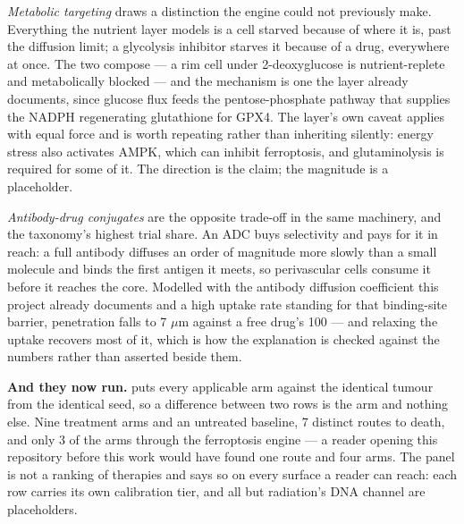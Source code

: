 \documentclass[11pt,twoside,openright]{report}
\begin{document}
\textit{Metabolic targeting} draws a distinction the engine could not previously make. Everything the nutrient layer models is a cell starved because of where it is, past the diffusion limit; a glycolysis inhibitor starves it because of a drug, everywhere at once. The two compose --- a rim cell under 2-deoxyglucose is nutrient-replete and metabolically blocked --- and the mechanism is one the layer already documents, since glucose flux feeds the pentose-phosphate pathway that supplies the NADPH regenerating glutathione for GPX4. The layer's own caveat applies with equal force and is worth repeating rather than inheriting silently: energy stress also activates AMPK, which can inhibit ferroptosis, and glutaminolysis is required for some of it. The direction is the claim; the magnitude is a placeholder.

\textit{Antibody-drug conjugates} are the opposite trade-off in the same machinery, and the taxonomy's highest trial share. An ADC buys selectivity and pays for it in reach: a full antibody diffuses an order of magnitude more slowly than a small molecule and binds the first antigen it meets, so perivascular cells consume it before it reaches the core. Modelled with the antibody diffusion coefficient this project already documents and a high uptake rate standing for that binding-site barrier, penetration falls to 7 $\mu$m against a free drug's 100 --- and relaxing the uptake recovers most of it, which is how the explanation is checked against the numbers rather than asserted beside them.

\textbf{And they now run.}  puts every applicable arm against the identical tumour from the identical seed, so a difference between two rows is the arm and nothing else. Nine treatment arms and an untreated baseline, 7 distinct routes to death, and only 3 of the arms through the ferroptosis engine --- a reader opening this repository before this work would have found one route and four arms. The panel is not a ranking of therapies and says so on every surface a reader can reach: each row carries its own calibration tier, and all but radiation's DNA channel are placeholders.
\end{document}

